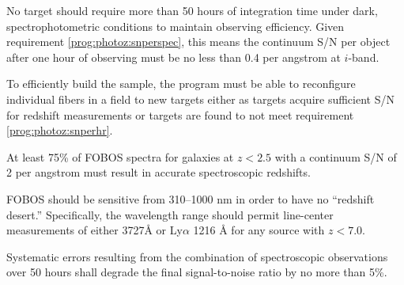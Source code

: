 \documentclass[11pt,a4paper,twoside,onecolumn,openany,final,oldfontcommands]{memoir}
\begin{document}
\begin{programrequirement}
\reqitem No target should require more than 50 hours of integration time under dark, spectrophotometric conditions to maintain observing efficiency.  Given requirement \ref{prog:photoz:snperspec}, this means the continuum S/N per object after one hour of observing must be no less than 0.4 per angstrom at $i$-band.  \label{prog:photoz:snperhr}

\reqitem To efficiently build the sample, the program must be able to reconfigure individual fibers in a field to new targets either as targets acquire sufficient S/N for redshift measurements or targets are found to not meet requirement \ref{prog:photoz:snperhr}.
\end{programrequirement}

\medskip
\begin{sciencerequirement}
\reqitem At least 75\% of FOBOS spectra for galaxies at $z<2.5$ with a continuum S/N of 2 per angstrom must result in accurate spectroscopic redshifts. \label{prog:photoz:zcomplete}

\reqitem FOBOS should be sensitive from 310--1000 nm in order to have no ``redshift desert.''  Specifically, the wavelength range should permit line-center measurements of either  3727\AA{} or Ly$\alpha$ 1216 \AA{} for any source with $z < 7.0$.  

\reqitem Systematic errors resulting from the combination of spectroscopic observations over 50 hours shall degrade the final signal-to-noise ratio by no more than 5\%.  

\end{sciencerequirement}


\end{document}
